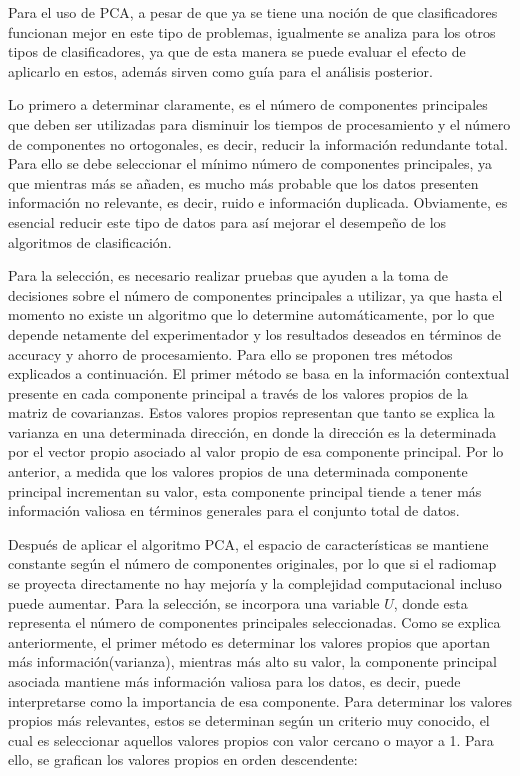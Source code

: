 Para el uso de PCA, a pesar de que ya se tiene una noción de que clasificadores funcionan mejor en este tipo de problemas, igualmente se analiza para los otros tipos de clasificadores, ya que de esta manera se puede evaluar el efecto de aplicarlo en estos, además sirven como guía para el análisis posterior.

Lo primero a determinar claramente, es el número de componentes principales que deben ser utilizadas para disminuir los tiempos de procesamiento y el número de componentes no ortogonales, es decir, reducir la información redundante total. Para ello se debe seleccionar el mínimo número de componentes principales, ya que mientras más se añaden, es mucho más probable que los datos presenten información no relevante, es decir, ruido e información duplicada. Obviamente, es esencial reducir este tipo de datos para así mejorar el desempeño de los algoritmos de clasificación.

Para la selección, es necesario realizar pruebas que ayuden a la toma de decisiones sobre el número de componentes principales a utilizar, ya que hasta el momento no existe un algoritmo que lo determine automáticamente, por lo que depende netamente del experimentador y los resultados deseados en términos de accuracy y ahorro de procesamiento. Para ello se proponen tres métodos explicados a continuación. El primer método se basa en la información contextual presente en cada componente principal a través de los valores propios de la matriz de covarianzas. Estos valores propios representan que tanto se explica la varianza en una determinada dirección, en donde la dirección es la determinada por el vector propio asociado al valor propio de esa componente principal. Por lo anterior, a medida que los valores propios de una determinada componente principal incrementan su valor, esta componente principal tiende a tener más información valiosa en términos generales para el conjunto total de datos. 

Después de aplicar el algoritmo PCA, el espacio de características se mantiene constante según el número de componentes originales, por lo que si el radiomap se proyecta directamente no hay mejoría y la complejidad computacional incluso puede aumentar. Para la selección, se incorpora una variable $U$, donde esta representa el número de componentes principales seleccionadas. Como se explica anteriormente, el primer método es determinar los valores propios que aportan más información(varianza), mientras más alto su valor, la componente principal asociada mantiene más información valiosa para los datos, es decir, puede interpretarse como la importancia de esa componente. Para determinar los valores propios más relevantes, estos se determinan según un criterio muy conocido, el cual es seleccionar aquellos valores propios con valor cercano o mayor a 1. Para ello, se grafican los valores propios en orden descendente:

